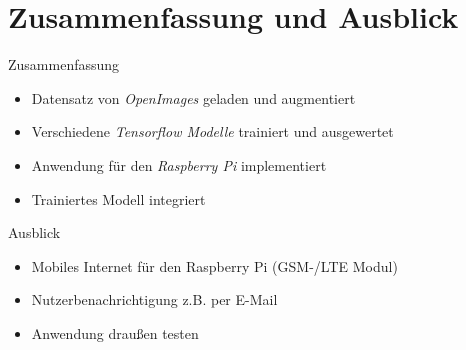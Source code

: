 \section[\thesection \  Ausblick]{Zusammenfassung und Ausblick}\label{sec:conclusion}

\begin{frame}{Zusammenfassung}

    \begin{itemize}
        \item Datensatz von \textit{OpenImages} geladen und augmentiert
    \end{itemize}
    
    \begin{itemize}
        \item Verschiedene \textit{Tensorflow Modelle} trainiert und ausgewertet
    \end{itemize}
    \begin{itemize}
        \item Anwendung für den \textit{Raspberry Pi} implementiert
    \end{itemize}
    \begin{itemize}
        \item Trainiertes Modell integriert
    \end{itemize}

    \vspace{0.5cm}
        
        \begin{block}{Ausblick}
            \begin{itemize}
                \item Mobiles Internet für den Raspberry Pi (GSM-/LTE Modul)
            \end{itemize}
            \begin{itemize}
                \item Nutzerbenachrichtigung z.B. per E-Mail
            \end{itemize}
            \begin{itemize}
                \item Anwendung draußen testen
            \end{itemize}
              
        \end{block}

\end{frame}